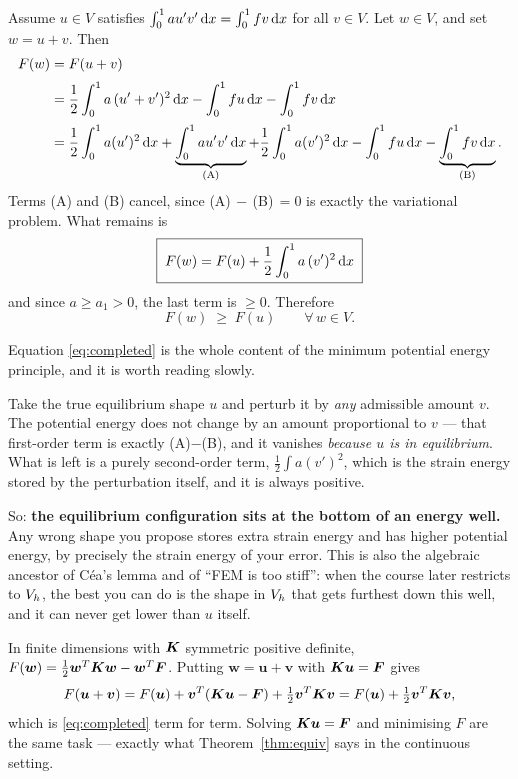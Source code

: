 Assume $u\in V$ satisfies $\int_{0}^{1}au'v'\,\mathrm{d} x = \int_{0}^{1}fv\,\mathrm{d} x$ for all
$v\in V$. Let $w\in V$, and set $w = u+v$. Then
\begin{align}
  F(w) &= F(u+v) \notag\\[2pt]
   &= \frac12\int_{0}^{1} a\,(u'+v')^{2}\,\mathrm{d} x
      - \int_{0}^{1} f u\,\mathrm{d} x - \int_{0}^{1} f v\,\mathrm{d} x \notag\\[2pt]
   &= \frac12\int_{0}^{1} a(u')^{2}\,\mathrm{d} x
    + \underbrace{\int_{0}^{1} a u'v'\,\mathrm{d} x}_{\text{(A)}}
    + \frac12\int_{0}^{1} a(v')^{2}\,\mathrm{d} x
    - \int_{0}^{1} f u\,\mathrm{d} x
    - \underbrace{\int_{0}^{1} f v\,\mathrm{d} x}_{\text{(B)}} .
    \label{eq:expand}
\end{align}
Terms (A) and (B) cancel, since (A)$\,-\,$(B)$\,=0$ is exactly the variational
problem. What remains is
\begin{equation}\label{eq:completed}
  \boxed{\;F(w) = F(u) + \frac12\int_{0}^{1} a\,(v')^{2}\,\mathrm{d} x\;}
\end{equation}
and since $a\ge a_{1}>0$, the last term is $\ge 0$. Therefore
\begin{equation}
  F(w) \;\ge\; F(u) \qquad \forall\, w\in V .
\end{equation}

\begin{intuition}
Equation \eqref{eq:completed} is the whole content of the minimum potential
energy principle, and it is worth reading slowly.

Take the true equilibrium shape $u$ and perturb it by \emph{any} admissible
amount $v$. The potential energy does not change by an amount proportional to
$v$ --- that first-order term is exactly (A)$-$(B), and it vanishes
\emph{because $u$ is in equilibrium}. What is left is a purely second-order
term, $\tfrac12\int a(v')^{2}$, which is the strain energy stored by the
perturbation itself, and it is always positive.

So: \textbf{the equilibrium configuration sits at the bottom of an energy
well.} Any wrong shape you propose stores extra strain energy and has higher
potential energy, by precisely the strain energy of your error. This is also
the algebraic ancestor of Céa's lemma and of ``FEM is too stiff'': when the
course later restricts to $V_{h}$, the best you can do is the shape in $V_{h}$ that
gets furthest down this well, and it can never get lower than $u$ itself.
\end{intuition}

\begin{recall}
In finite dimensions with $\bm{K}$ symmetric positive definite,
$F(\bm{w})=\tfrac12\bm{w}^{T}\bm{K}\bm{w}-\bm{w}^{T}\bm{F}$. Putting
$\bm{w}=\bm{u}+\bm{v}$ with $\bm{K}\bm{u}=\bm{F}$ gives
\[
  F(\bm{u}+\bm{v}) = F(\bm{u}) + \bm{v}^{T}(\bm{K}\bm{u}-\bm{F})
                     + \tfrac12\bm{v}^{T}\bm{K}\bm{v}
                   = F(\bm{u}) + \tfrac12\bm{v}^{T}\bm{K}\bm{v},
\]
which is \eqref{eq:completed} term for term. Solving $\bm{K}\bm{u}=\bm{F}$ and
minimising $F$ are the same task --- exactly what Theorem~\ref{thm:equiv} says
in the continuous setting.
\end{recall}

